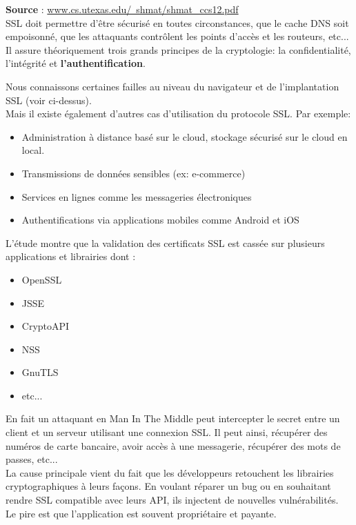 			\textbf{Source} :
			\href{http://www.cs.utexas.edu/~shmat/shmat_ccs12.pdf}
			{www.cs.utexas.edu/~shmat/shmat\_ccs12.pdf}\\
			
			SSL doit permettre d'être sécurisé en toutes circonstances, que le
			cache DNS soit empoisonné, que les attaquants contrôlent les
			points d'accès et les routeurs, etc...\\
			
			Il assure théoriquement trois grands principes de la
			cryptologie: la confidentialité, l'intégrité et
			\textbf{l'authentification}.
		
			Nous connaissons certaines failles au niveau du navigateur et de
			l'implantation SSL (voir ci-dessus).\\
			
			Mais il existe également d'autres cas d'utilisation du protocole SSL.
			Par exemple:
			\begin{itemize}
			\item Administration à distance basé sur le cloud, stockage 
			sécurisé sur le cloud en local.
			\item Transmissions de données sensibles (ex: e-commerce)
			\item Services en lignes comme les messageries électroniques
			\item Authentifications via applications mobiles comme Android et iOS
			\end{itemize}
			
			L'étude montre que la validation des certificats SSL est cassée
			sur plusieurs applications et librairies dont :
			\begin{itemize}
			\item OpenSSL
			\item JSSE
			\item CryptoAPI
			\item NSS
			\item GnuTLS
			\item etc...\\
			\end{itemize} 
			En fait un attaquant en Man In The Middle peut intercepter le
			secret entre un client et un serveur utilisant une connexion SSL.
			Il peut ainsi, récupérer des numéros de carte bancaire, avoir accès
			à une messagerie, récupérer des mots de passes, etc...\\
			
			La cause principale vient du fait que les développeurs retouchent
			les librairies cryptographiques à leurs façons. En voulant réparer
			un bug ou en souhaitant rendre SSL compatible avec leurs API, ils
			injectent de nouvelles vulnérabilités.\\
			Le pire est que l'application est souvent propriétaire et payante.\\
			
